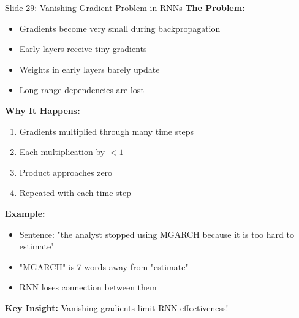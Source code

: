 \documentclass[8pt]{beamer}
\begin{document}
	\begin{frame}{Slide 29: Vanishing Gradient Problem in RNNs}
		\fontsize{6.5}{7.5}\selectfont
		\textbf{The Problem:}
		\begin{itemize}
			\item Gradients become very small during backpropagation
			\item Early layers receive tiny gradients
			\item Weights in early layers barely update
			\item Long-range dependencies are lost
		\end{itemize}
		
		\vspace{0.1cm}
		\textbf{Why It Happens:}
		\begin{enumerate}
			\item Gradients multiplied through many time steps
			\item Each multiplication by $< 1$
			\item Product approaches zero
			\item Repeated with each time step
		\end{enumerate}
		
		\vspace{0.1cm}
		\textbf{Example:}
		\begin{itemize}
			\item Sentence: "the analyst stopped using MGARCH because it is too hard to estimate"
			\item "MGARCH" is 7 words away from "estimate"
			\item RNN loses connection between them
		\end{itemize}
		
		\textcolor{myblue}{\textbf{Key Insight:}} Vanishing gradients limit RNN effectiveness!
	\end{frame}
	
\end{document}
